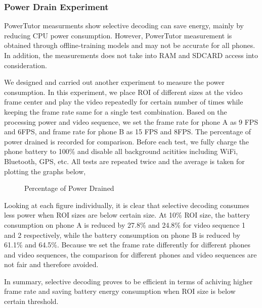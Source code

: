 \subsubsection{Power Drain Experiment}
PowerTutor measurments show selective decoding can save energy, mainly by reducing CPU power consumption. However, PowerTutor measurement is obtained through offline-training models\cite{Zhang:2010:AOP:1878961.1878982} and may not be accurate for all phones. In addition, the measurements does not take into RAM and SDCARD access into consideration. 

We designed and carried out another experiment to measure the power consumption. In this experiment, we place ROI of different sizes at the video frame center and play the video repeatedly for certain number of times while keeping the frame rate same for a single test combination. Based on the processing power and video sequence, we set the frame rate for phone A as 9 FPS and 6FPS, and frame rate for phone B as 15 FPS and 8FPS. The percentage of power drained is recorded for comparison. Before each test, we fully charge the phone battery to 100\% and disable all background acitities including WiFi, Bluetooth, GPS, etc. All tests are repeated twice and the average is taken for plotting the graphs below,
\begin{figure}
\centering
\caption{Percentage of Power Drained}
\end{figure}
Looking at each figure individually, it is clear that selective decoding consumes less power when ROI sizes are below certain size. At 10\% ROI size, the battery consumption on phone A is reduced by 27.8\% and 24.8\% for video sequence 1 and 2 respectively, while the battery consumption on phone B is reduced by 61.1\% and 64.5\%. Because we set the frame rate differently for different phones and video sequences, the comparison for different phones and video sequences are not fair and therefore avoided. 

In summary, selective decoding proves to be efficient in terms of achiving higher frame rate and saving battery energy consumption when ROI size is below certain threshold.  




